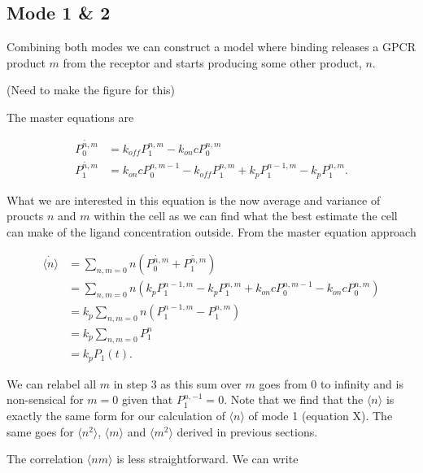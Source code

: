 \subsection{\label{sec:mode1and2}Mode 1 \& 2}

Combining both modes we can construct a model where binding releases a GPCR product $m$ from the receptor and starts producing some other product, $n$.

(Need to make the figure for this)

The master equations are

\begin{equation}
\begin{aligned}
 \dot{P_0^{n,m}} &= k_{off}P_1^{n,m} - k_{on}cP_0^{n,m} \\
 \dot{P_1^{n,m}} &= k_{on}cP_0^{n,m-1} - k_{off}P_1^{n,m} + k_pP_1^{n-1,m} - k_pP_1^{n,m}.
\end{aligned}
\end{equation}

What we are interested in this equation is the now average and variance of proucts $n$ and $m$ within the cell as we can find what the best estimate the cell can make of the ligand concentration outside. From the master equation approach

\begin{equation*}
\begin{aligned}
\dot{ \langle n \rangle } & = \sum_{n,m=0} n (\dot{P_0^{n,m}} + \dot{P_1^{n,m}})\\
                          & = \sum_{n,m=0} n (k_pP_1^{n-1,m} - k_pP_1^{n,m} + k_{on}cP_0^{n,m-1} - k_{on}cP_0^{n,m})\\
                          & = k_p \sum_{n,m=0} n (P_1^{n-1,m} - P_1^{n,m})\\
                          & = k_p \sum_{n,m=0} P_1^{n}\\
                          & = k_p P_1(t).
\end{aligned}
\end{equation*}

We can relabel all $m$ in step 3 as this sum over $m$ goes from $0$ to infinity and is non-sensical for $m=0$ given that $P_1^{n,-1}=0$. Note that we find that the $\langle n \rangle$ is exactly the same form for our calculation of $\langle n \rangle$ of mode 1 (equation X). The same goes for $\langle n^2 \rangle$, $\langle m \rangle$ and $\langle m^2 \rangle$ derived in previous sections.

The correlation $\langle nm \rangle$ is less straightforward. We can write

